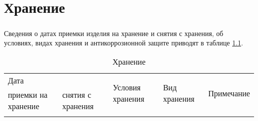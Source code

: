	
	
	
	

\chapter{Хранение}

	\paragraph{}Сведения о датах приемки изделия на хранение и снятия с хранения, об условиях, видах хранения и антикоррозионной защите приводят в таблице \ref{tab:save}.
	
	\begin{small}
	\begin{longtable}{|p{3cm}|p{3cm}|p{4cm}|p{3cm}|p{2.5cm}|}
		\caption{\label{tab:save} Хранение}\\ \hline
		
		\multicolumn{2}{|p{6cm}|}{Дата} & \multirow{2}{5cm}{Условия хранения} & \multirow{2}{4cm}{Вид хранения} & \multirow{2}{2.5cm}{Примечание} \\ \cline{1-2}
		приемки на хранение & снятия с хранения &  &  &  \\ \hline
		\rule{0cm}{20cm} & & & & \\ \hline
	\end{longtable}
	\end{small}




